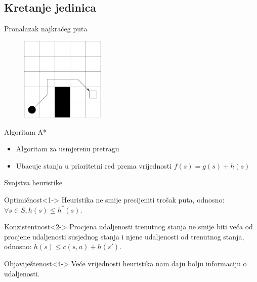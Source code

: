 \documentclass[utf8]{beamer}
\begin{document}
\subsection{Kretanje jedinica}

\begin{frame}{Pronalazak najkraćeg puta}
  \begin{figure}[h] 
    \centering
    \includegraphics[height=4cm]{images/basicGrid.pdf}
  \end{figure} 
\end{frame}

\begin{frame}{Algoritam A*}
  \begin{itemize}
    \item Algoritam za usmjerenu pretragu
    \item Ubacuje stanja u prioritetni red prema vrijednosti \(f(s) = g(s) + h(s)\)
  \end{itemize}
\end{frame}

\begin{frame}{Svojstva heuristike}
  \begin{block}{Optimičnost}<1->
    Heuristika ne smije precijeniti trošak puta, odnosno:
    \(\forall s \in S, h(s) \leq h^*(s)\).
  \end{block}
  
  \begin{block}{Konzistentnost}<2->
    Procjena udaljenosti trenutnog stanja ne smije biti veća od procjene udaljenosti susjednog stanja i njene udaljenosti od trenutnog stanja, odnosno:
    \(h(s) \leq c(s, a) + h(s')\).
  \end{block}


  \begin{block}{Objaviještenost}<4->
    Veće vrijednosti heuristika nam daju bolju informaciju o udaljenosti.
  \end{block}
\end{frame}
\end{document}
